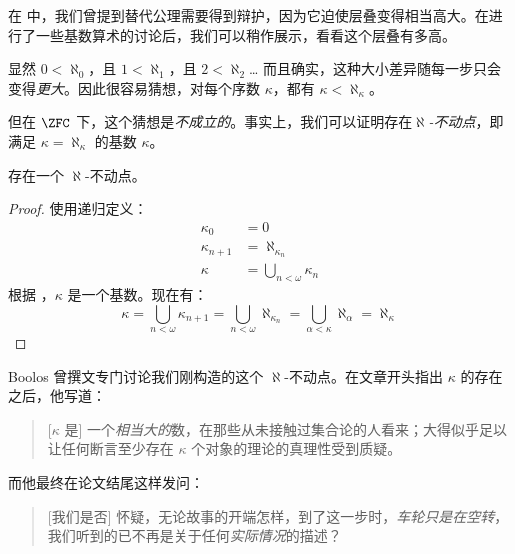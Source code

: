 \documentclass[../../../include/open-logic-section]{subfiles}
\begin{document}

在  中，我们曾提到替代公理需要得到辩护，因为它迫使层叠变得相当高大。在进行了一些基数算术的讨论后，我们可以稍作展示，看看这个层叠有多高。

显然 $0 < \aleph_0$，且 $1 < \aleph_1$，且 $2 < \aleph_2$\ldots
而且确实，这种大小差异随每一步只会变得\emph{更大}。因此很容易猜想，对每个序数 $\kappa$，都有 $\kappa< \aleph_\kappa$。

但在 $\ZFC$ 下，这个猜想是\emph{不成立的}。事实上，我们可以证明存在\emph{$\aleph$-不动点}，即满足 $\kappa=\aleph_\kappa$ 的基数 $\kappa$。

\begin{prop}
存在一个 $\aleph$-不动点。
\end{prop}

\begin{proof}
使用递归定义：
\begin{align*}
	\kappa_0 &= 0\\
	\kappa_{n+1} &= \aleph_{\kappa_n}\\
	\kappa&= \bigcup_{n < \omega}\kappa_n
\end{align*}
根据 ，$\kappa$ 是一个基数。现在有：
\[
	\kappa= \bigcup_{n < \omega} \kappa_{n+1} =
	\bigcup_{n < \omega}\aleph_{\kappa_n} =
	\bigcup_{\alpha < \kappa}\aleph_\alpha = \aleph_\kappa
\]
\end{proof}


Boolos 曾撰文专门讨论我们刚构造的这个 $\aleph$-不动点。在文章开头指出 $\kappa$ 的存在之后，他写道：

\begin{quote}
    [$\kappa$ 是] 一个\emph{相当大的}数，在那些从未接触过集合论的人看来；大得似乎足以让任何断言至少存在 $\kappa$ 个对象的理论的真理性受到质疑。
    \citep[p.~257]{Boolos2000}
\end{quote}

而他最终在论文结尾这样发问：

\begin{quote}
    [我们是否] 怀疑，无论故事的开端怎样，到了这一步时，\emph{车轮只是在空转}，我们听到的已不再是关于任何\emph{实际情况}的描述？
    \citep[p.~268]{Boolos2000}
\end{quote}
\end{document}
